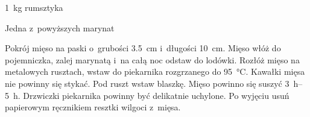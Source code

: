 \documentclass[../kucharek.tex]{subfiles}
\begin{document}

\begin{Ingred}
    \item \qty{1}{\kilo\gram} rumsztyka
    \item Jedna z~powyższych marynat
\end{Ingred}

Pokrój mięso na paski o~grubości \qty{3.5}{\centi\metre} i~długości
\qty{10}{\centi\metre}. Mięso włóż do pojemniczka, zalej marynatą i~na całą noc
odstaw do lodówki. Rozłóż mięso na metalowych rusztach, wstaw do piekarnika
rozgrzanego do \qty{95}{\celsius}. Kawałki mięsa nie powinny się stykać. Pod
ruszt wstaw blaszkę. Mięso powinno się suszyć \qtyrange{3}{5}{\hour}. Drzwiczki
piekarnika powinny być delikatnie uchylone. Po wyjęciu usuń papierowym
ręcznikiem resztki wilgoci z~mięsa.
\end{document}
